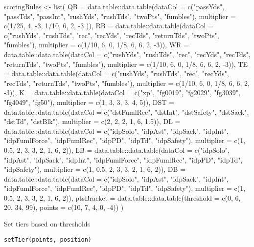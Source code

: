 \documentclass[a4paper]{book}
\begin{document}
\begin{Examples}
\begin{ExampleCode}
scoringRules <- list(
   QB = data.table::data.table(dataCol = c("passYds", "passTds", "passInt", "rushYds", "rushTds", "twoPts", "fumbles"),
                               multiplier = c(1/25, 4, -3, 1/10, 6, 2, -3 )),
   RB = data.table::data.table(dataCol = c("rushYds", "rushTds", "rec", "recYds", "recTds", "returnTds", "twoPts", "fumbles"),
                               multiplier = c(1/10, 6, 0, 1/8, 6, 6, 2, -3)),
   WR = data.table::data.table(dataCol = c("rushYds", "rushTds", "rec", "recYds", "recTds", "returnTds", "twoPts", "fumbles"),
                               multiplier = c(1/10, 6, 0, 1/8, 6, 6, 2, -3)),
   TE = data.table::data.table(dataCol = c("rushYds", "rushTds", "rec", "recYds", "recTds", "returnTds", "twoPts", "fumbles"),
                               multiplier = c(1/10, 6, 0, 1/8, 6, 6, 2, -3)),
   K = data.table::data.table(dataCol = c("xp", "fg0019", "fg2029", "fg3039", "fg4049", "fg50"),
                              multiplier = c(1,  3, 3, 3, 4, 5)),
   DST = data.table::data.table(dataCol = c("dstFumlRec", "dstInt", "dstSafety", "dstSack", "dstTd", "dstBlk"),
                                multiplier = c(2, 2, 2, 1, 6, 1.5)),
   DL = data.table::data.table(dataCol = c("idpSolo", "idpAst", "idpSack", "idpInt", "idpFumlForce", "idpFumlRec", "idpPD", "idpTd", "idpSafety"),
                               multiplier = c(1, 0.5, 2, 3, 3, 2, 1, 6, 2)),
   LB =  data.table::data.table(dataCol = c("idpSolo", "idpAst", "idpSack", "idpInt", "idpFumlForce", "idpFumlRec", "idpPD", "idpTd", "idpSafety"),
                                multiplier = c(1, 0.5, 2, 3, 3, 2, 1, 6, 2)),
   DB = data.table::data.table(dataCol = c("idpSolo", "idpAst", "idpSack", "idpInt", "idpFumlForce", "idpFumlRec", "idpPD", "idpTd", "idpSafety"),
                               multiplier = c(1, 0.5, 2, 3, 3, 2, 1, 6, 2)),
   ptsBracket = data.table::data.table(threshold = c(0, 6, 20, 34, 99),
                                       points = c(10, 7, 4, 0, -4))
)
\end{ExampleCode}
\end{Examples}
%
\begin{Description}\relax
Set tiers based on thresholds
\end{Description}
%
\begin{Usage}
\begin{verbatim}
setTier(points, position)
\end{verbatim}
\end{Usage}
\end{document}

